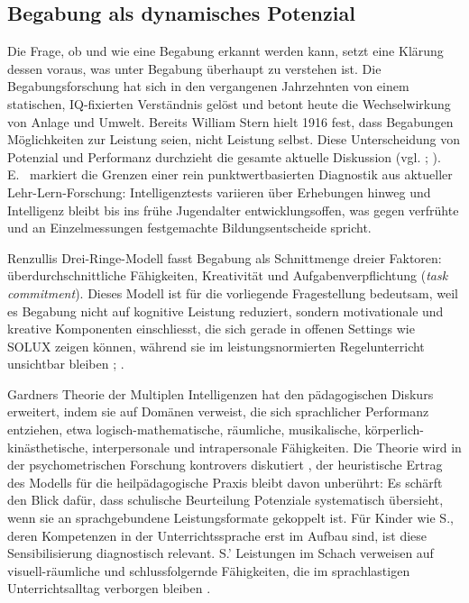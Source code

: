 \documentclass[ngerman, a4paper]{article}
\begin{document}
\subsection{Begabung als dynamisches Potenzial}

Die Frage, ob und wie eine Begabung erkannt werden kann, setzt eine Klärung dessen
voraus, was unter Begabung überhaupt zu verstehen ist. Die Begabungsforschung hat sich
in den vergangenen Jahrzehnten von einem statischen, IQ-fixierten Verständnis gelöst und
betont heute die Wechselwirkung von Anlage und Umwelt. Bereits William Stern hielt
1916 fest, dass Begabungen Möglichkeiten zur Leistung seien, nicht Leistung selbst.
Diese Unterscheidung von Potenzial und Performanz durchzieht die gesamte aktuelle
Diskussion (vgl. \textcite[Kap.\,1.1--1.2]{preckel2013hochbegabung}; 
\textcite[S.\,34--41]{trautmann2016einfuehrung}).
E.~\textcite{stern2025intelligenz} markiert die Grenzen einer rein 
punktwertbasierten Diagnostik aus aktueller Lehr-Lern-Forschung: 
Intelligenztests variieren über Erhebungen hinweg und Intelligenz 
bleibt bis ins frühe Jugendalter entwicklungsoffen, was gegen 
verfrühte und an Einzelmessungen festgemachte Bildungsentscheide 
spricht.

Renzullis Drei-Ringe-Modell fasst Begabung als Schnittmenge dreier Faktoren:
überdurchschnittliche Fähigkeiten, Kreativität und Aufgabenverpflichtung
(\textit{task commitment}). Dieses Modell ist für die vorliegende Fragestellung bedeutsam,
weil es Begabung nicht auf kognitive Leistung reduziert, sondern motivationale und
kreative Komponenten einschliesst, die sich gerade in offenen Settings wie SOLUX zeigen
können, während sie im leistungsnormierten Regelunterricht unsichtbar bleiben
\parencite[S.\,204--222]{muelleroppliger2021handbuch};
\parencite[S.\,94--103]{hoyer2013begabung}.

Gardners Theorie der Multiplen Intelligenzen hat den pädagogischen Diskurs erweitert,
indem sie auf Domänen verweist, die sich sprachlicher Performanz entziehen, etwa
logisch-mathematische, räumliche, musikalische, körperlich-kinästhetische, interpersonale
und intrapersonale Fähigkeiten. Die Theorie wird in der psychometrischen Forschung
kontrovers diskutiert \parencite[S.\,73--75]{hoyer2013begabung}, der heuristische
Ertrag des Modells für die heilpädagogische Praxis bleibt davon unberührt: Es schärft
den Blick dafür, dass schulische Beurteilung Potenziale systematisch übersieht, wenn
sie an sprachgebundene Leistungsformate gekoppelt ist. Für Kinder wie S., deren
Kompetenzen in der Unterrichtssprache erst im Aufbau sind, ist diese Sensibilisierung
diagnostisch relevant. S.' Leistungen im Schach verweisen auf visuell-räumliche und
schlussfolgernde Fähigkeiten, die im sprachlastigen Unterrichtsalltag verborgen
bleiben \parencite[S.\,34--41]{trautmann2016einfuehrung}.
\end{document}
